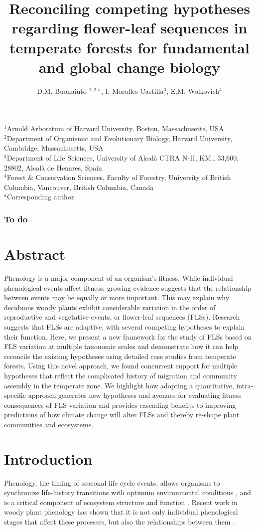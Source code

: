 \documentclass{article}
\title{Reconciling competing hypotheses regarding flower-leaf sequences in temperate forests for fundamental and global change biology}
\author{D.M. Buonaiuto $^{1,2,a}$, I. Moralles Castilla$^{3}$, E.M. Wolkovich$^{4}$}
\begin{document}
\maketitle
\noindent $^1$Arnold Arboretum of Harvard University, Boston, Massachusetts, USA\\
$^2$Department of Organismic and Evolutionary Biology, Harvard University, Cambridge, Massachusetts, USA\\
$^3$Department of Life Sciences, University of Alcal\`a CTRA N-II, KM., 33,600, 28802, Alcal\`a de Henares, Spain\\
$^4$Forest \& Conservation Sciences, Faculty of Forestry, University of British Columbia, Vancouver, British Columbia, Canada\\
$^a$Corresponding author.
\subsubsection*{To do}

\section*{Abstract}
Phenology is a major component of an organism's fitness. While individual phenological events affect fitness, growing evidence suggests that the relationship between events may be equally or more important. This may explain why deciduous woody plants exhibit considerable variation in the order of reproductive and vegetative events, or flower-leaf sequences (FLSs). Research suggests that FLSs are adaptive, with several competing hypotheses to explain their function. Here, we present a new framework for the study of FLSs based on FLS variation at multiple taxonomic scales and demonstrate how it can help reconcile the existing hypotheses using detailed case studies from temperate forests. Using this novel approach, we found concurrent support for multiple hypotheses that reflect the complicated history of migration and community assembly in the temperate zone. We highlight how adopting a quantitative, intra-specific approach generates new hypotheses and avenues for evaluating fitness consequences of FLS variation and provides cascading benefits to improving predictions of how climate change will alter FLSs and thereby re-shape plant communities and ecosystems.


\section*{Introduction}
Phenology, the timing of seasonal life cycle events, allows organisms to synchronize life-history transitions with optimum environmental conditions \citep{Forrest2010}, and is a critical component of ecosystem structure and function \citep{Cleland2007,Piao2007}. Recent work in woody plant phenology has shown that it is not only individual phenological stages that affect these processes, but also the relationships between them \citep{Ettinger2018}.\\
\end{document}

